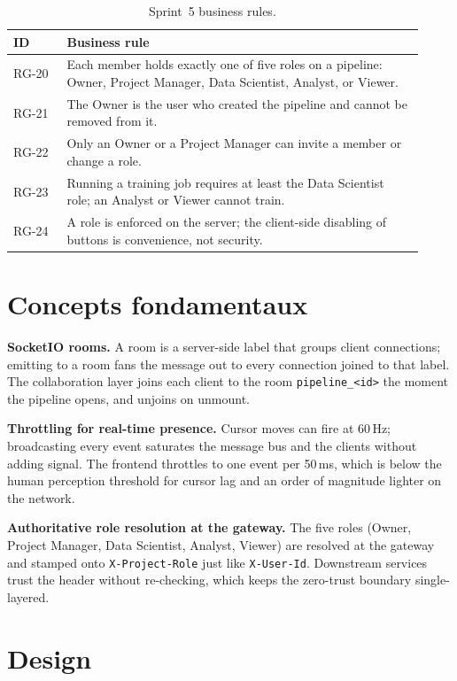 \documentclass[12pt, a4paper, oneside]{report}
\begin{document}
\begin{table}[H]
\centering
\caption{Sprint~5 business rules.}
\label{tab:sprint5_rules}
\begin{tabular}{|p{0.12\linewidth}|L{0.80\linewidth}|}
\hline
\textbf{ID} & \textbf{Business rule} \\
\hline
RG-20 & Each member holds exactly one of five roles on a pipeline: Owner, Project Manager, Data Scientist, Analyst, or Viewer. \\ \hline
RG-21 & The Owner is the user who created the pipeline and cannot be removed from it. \\ \hline
RG-22 & Only an Owner or a Project Manager can invite a member or change a role. \\ \hline
RG-23 & Running a training job requires at least the Data Scientist role; an Analyst or Viewer cannot train. \\ \hline
RG-24 & A role is enforced on the server; the client-side disabling of buttons is convenience, not security. \\
\hline
\end{tabular}
\end{table}

\section{Concepts fondamentaux}

\textbf{SocketIO rooms.} A room is a server-side label that groups
client connections; emitting to a room fans the message out to every
connection joined to that label. The collaboration layer joins each
client to the room \texttt{pipeline\_<id>} the moment the pipeline
opens, and unjoins on unmount.

\textbf{Throttling for real-time presence.} Cursor moves can fire at
60\,Hz; broadcasting every event saturates the message bus and the
clients without adding signal. The frontend throttles to one event
per 50\,ms, which is below the human perception threshold for
cursor lag and an order of magnitude lighter on the network.

\textbf{Authoritative role resolution at the gateway.} The five
roles (Owner, Project Manager, Data Scientist, Analyst, Viewer) are
resolved at the gateway and stamped onto \texttt{X-Project-Role}
just like \texttt{X-User-Id}. Downstream services trust the header
without re-checking, which keeps the zero-trust boundary
single-layered.

\section{Design}
\end{document}
